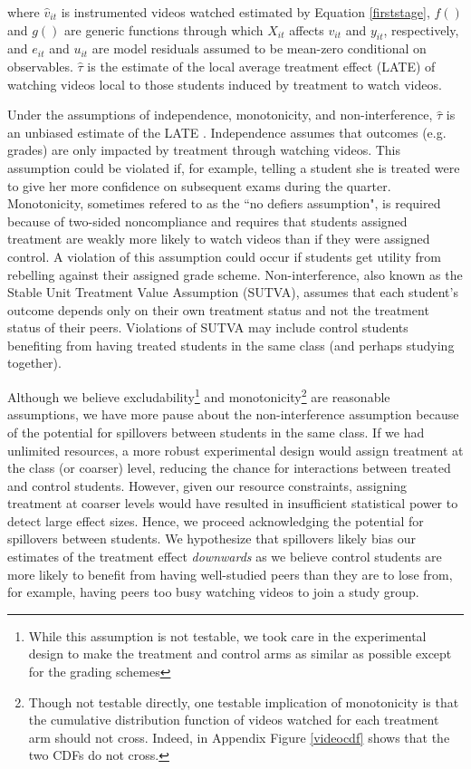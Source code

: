 \documentclass[12pt]{article}
\begin{document}
where $\hat{v}_{it}$ is instrumented videos watched estimated by Equation \ref{firststage}, $f()$ and $g()$ are generic functions through which $X_{it}$ affects $v_{it}$ and $y_{it}$, respectively, and $e_{it}$ and $u_{it}$ are model residuals assumed to be mean-zero conditional on observables. $\hat{\tau}$ is the estimate of the local average treatment effect (LATE) of watching videos local to those students induced by treatment to watch videos. 

Under the assumptions of independence, monotonicity, and non-interference, $\hat{\tau}$ is an unbiased estimate of the LATE \parencite{ai1995}. Independence assumes that outcomes (e.g. grades) are only impacted by treatment through watching videos. This assumption could be violated if, for example, telling a student she is treated were to give her more confidence on subsequent exams during the quarter. Monotonicity, sometimes refered to as the ``no defiers assumption", is required because of two-sided noncompliance and requires that students assigned treatment are weakly more likely to watch videos than if they were assigned control. A violation of this assumption could occur if students get utility from rebelling against their assigned grade scheme. Non-interference, also known as the Stable Unit Treatment Value Assumption (SUTVA), assumes that each student's outcome depends only on their own treatment status and not the treatment status of their peers. Violations of SUTVA may include control students benefiting from having treated students in the same class (and perhaps studying together).

Although we believe excludability\footnote{While this assumption is not testable, we took care in the experimental design to make the treatment and control arms as similar as possible except for the grading schemes} and monotonicity\footnote{Though not testable directly, one testable implication of monotonicity is that the cumulative distribution function of videos watched for each treatment arm should not cross. Indeed, in Appendix Figure \ref{videocdf} shows that the two CDFs do not cross.}  are reasonable assumptions, we have more pause about the non-interference assumption because of the potential for spillovers between students in the same class. If we had unlimited resources, a more robust experimental design would assign treatment at the class (or coarser) level, reducing the chance for interactions between treated and control students. However, given our resource constraints, assigning treatment at coarser levels would have resulted in insufficient statistical power to detect large effect sizes. Hence, we proceed acknowledging the potential for spillovers between students. We hypothesize that spillovers likely bias our estimates of the treatment effect \textit{downwards} as we believe control students are more likely to benefit from having well-studied peers than they are to lose from, for example, having peers too busy watching videos to join a study group.	
\end{document}

